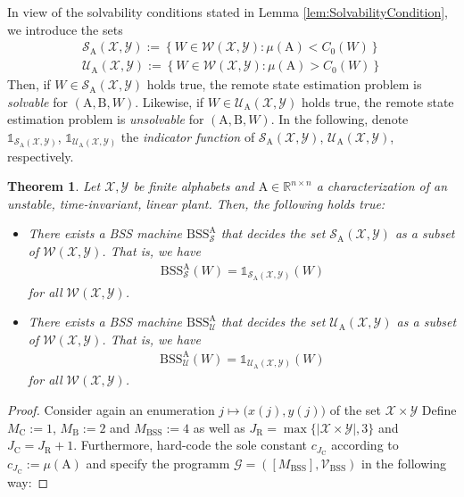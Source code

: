 \documentclass[conference]{IEEEtran}
\def\X{{\mathcal X}}
\def\Y{{\mathcal Y}}
\def\G{{\mathcal G}}
\def\V{{\mathcal V}}
\def\W{{\mathcal W}}
\def\S{{\mathcal S}}
\def\U{{\mathcal U}}
\def\RR{{\mathbb R}}
\def\mA{\bm{\mathrm{A}}}
\def\mB{\bm{\mathrm{B}}}
\newcommand{\BSS}{\mathrm{BSS}}
\newtheorem{Theorem}{Theorem}
\begin{document}
	In view of the solvability conditions stated in Lemma \ref{lem:SolvabilityCondition}, we introduce the sets
	\begin{align*}	\S_{\mA}(\X,\Y) := \left\{ W\in \W(\X,\Y) : \mu(\mA) < C_0(W) \right\} \\ 
					\U_{\mA}(\X,\Y) := \left\{ W\in \W(\X,\Y) : \mu(\mA) > C_0(W) \right\} 
	\end{align*}
	Then, if \(W\in \S_{\mA}(\X,\Y)\) holds true, the remote state estimation problem is \emph{solvable} for \((\mA,\mB, W)\).
	Likewise, if \(W\in \U_{\mA}(\X,\Y)\) holds true, the remote state estimation problem is \emph{unsolvable} for \((\mA,\mB, W)\).
	In the following, denote \(\mathds{1}_{\S_{\mA}(\X,\Y)}\), \(\mathds{1}_{\U_{\mA}(\X,\Y)}\) the \emph{indicator function}
	of \(\S_{\mA}(\X,\Y)\), \(\U_{\mA}(\X,\Y)\), respectively.
	\begin{Theorem}	\label{thm:RemoteStateEstimationBSSDecidable}
					Let \(\X,\Y\) be finite alphabets and \(\mA \in \RR^{n\times n}\) a characterization of an unstable, time-invariant, 
					linear plant. Then, the following holds true:
					\begin{itemize}	\item There exists a BSS machine \(\BSS_{\S}^{\mA}\) that \emph{decides} the set
										\(\S_{\mA}(\X,\Y)\) as a subset of \(\W(\X,\Y)\). That is, we have
										\begin{align*}	\BSS_{\S}^{\mA}(W) = 	\mathds{1}_{\S_{\mA}(\X,\Y)}(W)
										\end{align*}
										for all \(\W(\X,\Y)\).
									\item There exists a BSS machine \(\BSS_{\U}^{\mA}\) that \emph{decides} the set
										\(\U_{\mA}(\X,\Y)\) as a subset of \(\W(\X,\Y)\). That is, we have
										\begin{align*}	\BSS_{\U}^{\mA}(W) = 	\mathds{1}_{\U_{\mA}(\X,\Y)}(W)
										\end{align*}
										for all \(\W(\X,\Y)\).
					\end{itemize}
	\end{Theorem}\begin{proof}
					Consider again an enumeration \(j \mapsto \big(x(j), y(j)\big)\) of the set \(\X\times\Y\) 
					Define \(M_\mathrm{C} := 1\), \(M_\mathrm{B} := 2\) and \(M_\BSS := 4\) as well as \(J_\mathrm{R} = \max\{|\X\times \Y|,3\}\) and 
					\(J_\mathrm{C} = J_\mathrm{R} + 1\). Furthermore, hard-code the sole constant \(c_{J_\mathrm{C}}\) according to
					\(c_{J_\mathrm{C} } := \mu(\mA)\) and specify the programm \(\G = ([M_\BSS],\V_\BSS)\) in the following way:

\end{proof}
\end{document}
